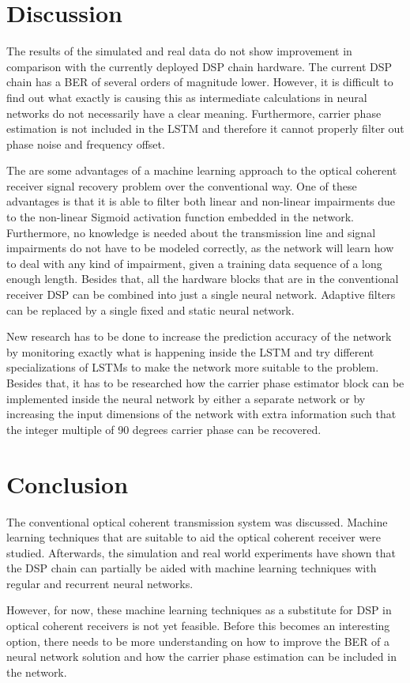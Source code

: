 \documentclass[journal,10pt,twoside, a4paper]{IEEEtran}
\begin{document}
\section{Discussion}
The results of the simulated and real data do not show improvement in comparison with the currently deployed DSP chain hardware. The current DSP chain has a BER of several orders of magnitude lower. However, it is difficult to find out what exactly is causing this as intermediate calculations in neural networks do not necessarily have a clear meaning. Furthermore, carrier phase estimation is not included in the LSTM and therefore it cannot properly filter out phase noise and frequency offset.

The are some advantages of a machine learning approach to the optical coherent receiver signal recovery problem over the conventional way. One of these advantages is that it is able to filter both linear and non-linear impairments due to the non-linear Sigmoid activation function embedded in the network. Furthermore, no knowledge is needed about the transmission line and signal impairments do not have to be modeled correctly, as the network will learn how to deal with any kind of impairment, given a training data sequence of a long enough length. Besides that, all the hardware blocks that are in the conventional receiver DSP can be combined into just a single neural network. Adaptive filters can be replaced by a single fixed and static neural network.

New research has to be done to increase the prediction accuracy of the network by monitoring exactly what is happening inside the LSTM and try different specializations of LSTMs to make the network more suitable to the problem. Besides that, it has to be researched how the carrier phase estimator block can be implemented inside the neural network by either a separate network or by increasing the input dimensions of the network with extra information such that the integer multiple of 90 degrees carrier phase can be recovered.

\section{Conclusion}
The conventional optical coherent transmission system was discussed. Machine learning techniques that are suitable to aid the optical coherent receiver were studied. Afterwards, the simulation and real world experiments have shown that the DSP chain can partially be aided with machine learning techniques with regular and recurrent neural networks.

However, for now, these machine learning techniques as a substitute for DSP in optical coherent receivers is not yet feasible. Before this becomes an interesting option, there needs to be more understanding on how to improve the BER of a neural network solution and how the carrier phase estimation can be included in the network.

\balance



\end{document}

